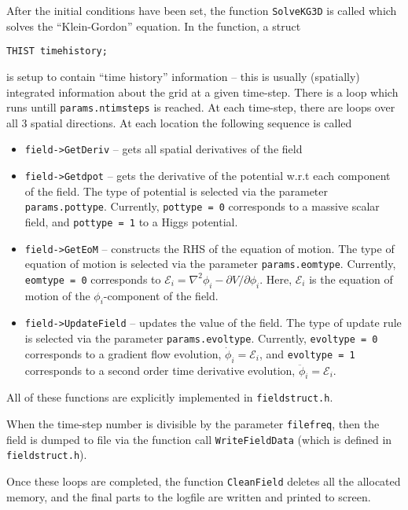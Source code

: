 \documentclass[amsmath,amssymb,12pt, eqsecnum]{revtex4}
\newcommand\codeRed[1]{\textcolor[rgb]{1,0,0}{{\tt #1}}}
\newcommand\codeBlue[1]{\textcolor[rgb]{0,0,1}{{\tt #1}}}
\begin{document}
After the initial conditions have been set, the function \codeBlue{SolveKG3D} is called which solves the ``Klein-Gordon'' equation. In the function, a struct
\begin{verbatim}
THIST timehistory;
\end{verbatim}
is setup to contain ``time history'' information -- this is usually (spatially) integrated information about the grid at a given time-step. There is a loop which runs untill {\tt params.ntimsteps} is reached. At each time-step, there are loops over all 3 spatial directions. At each location the following sequence is called
\begin{itemize}
\item \codeBlue{field->GetDeriv} -- gets all spatial derivatives of the field
\item \codeBlue{field->Getdpot} -- gets the derivative of the potential w.r.t each component of the field. The type of potential is selected via the parameter {\tt params.pottype}. Currently, {\tt pottype = 0} corresponds to a massive scalar field, and {\tt pottype = 1} to a Higgs potential.
\item \codeBlue{field->GetEoM} -- constructs the RHS of the equation of motion. The type of equation of motion is selected via the parameter {\tt params.eomtype}. Currently, {\tt eomtype = 0} corresponds to $\mathcal{E}_i = \nabla^2\phi_i -  {\partial V}/{\partial\phi_i}$. Here, $\mathcal{E}_i$ is the equation of motion of the $\phi_i$-component of the field.
\item \codeBlue{field->UpdateField} -- updates the value of the field. The type of update rule is selected via the parameter {\tt params.evoltype}. Currently, {\tt evoltype = 0} corresponds to a gradient flow evolution, $\dot{\phi}_i = \mathcal{E}_i$, and {\tt evoltype = 1} corresponds to a second order time derivative evolution, $\ddot{\phi}_i = \mathcal{E}_i$.
\end{itemize}
All of these functions are explicitly implemented in \codeRed{fieldstruct.h}.

When the time-step number is divisible by the parameter {\tt filefreq}, then the field is dumped to file via the function call \codeBlue{WriteFieldData} (which is defined in \codeRed{fieldstruct.h}).

Once these loops are completed, the function \codeBlue{CleanField} deletes all the allocated memory, and the final parts to the logfile are written and printed to screen.
\end{document}
